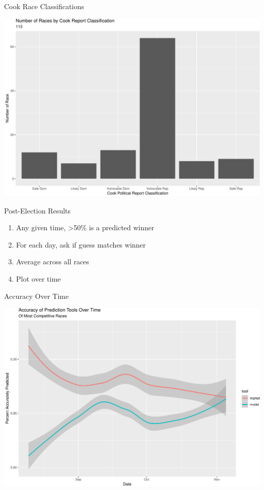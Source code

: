 \documentclass[ignorenonframetext,]{beamer}
\providecommand{\tightlist}{%
  \setlength{\itemsep}{0pt}\setlength{\parskip}{0pt}}
\begin{document}
\begin{frame}{Cook Race Classifications}

\includegraphics{markets_models_files/figure-beamer/class market-1.pdf}

\end{frame}

\begin{frame}{Post-Election Results}

\begin{enumerate}
\def\labelenumi{\arabic{enumi}.}
\tightlist
\item
  Any given time, \textgreater{}50\% is a predicted winner
\item
  For each day, ask if guess matches winner
\item
  Average across all races
\item
  Plot over time
\end{enumerate}

\end{frame}

\begin{frame}{Accuracy Over Time}

\includegraphics{markets_models_files/figure-beamer/accuracy-1.pdf}

\end{frame}
\end{document}

